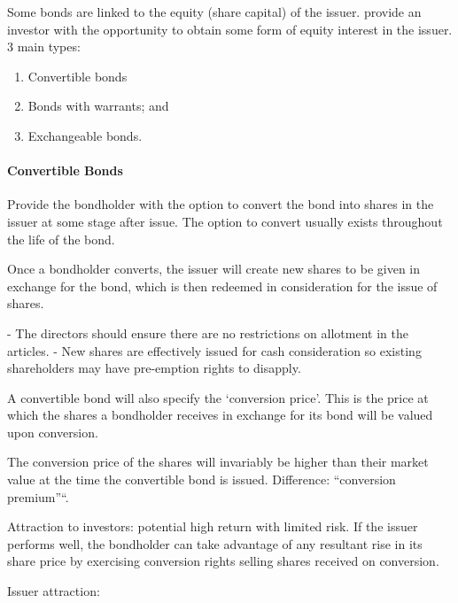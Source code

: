 \documentclass[
]{article}
\newenvironment{Shaded}{}{}
\newcommand{\NormalTok}[1]{#1}
\providecommand{\tightlist}{%
  \setlength{\itemsep}{0pt}\setlength{\parskip}{0pt}}
\begin{document}
Some bonds are linked to the equity (share capital) of the issuer.
provide an investor with the opportunity to obtain some form of equity
interest in the issuer. 3 main types:

\begin{enumerate}
\def\labelenumi{\arabic{enumi}.}
\tightlist
\item
  Convertible bonds
\item
  Bonds with warrants; and
\item
  Exchangeable bonds.
\end{enumerate}

\hypertarget{convertible-bonds}{%
\paragraph{Convertible Bonds}\label{convertible-bonds}}

Provide the bondholder with the option to convert the bond into shares
in the issuer at some stage after issue. The option to convert usually
exists throughout the life of the bond.

Once a bondholder converts, the issuer will create new shares to be
given in exchange for the bond, which is then redeemed in consideration
for the issue of shares.

\begin{Shaded}
\begin{Highlighting}[]
\NormalTok{{-} The directors should ensure there are no restrictions on allotment in the articles.}
\NormalTok{{-} New shares are effectively issued for cash consideration so existing shareholders may have pre{-}emption rights to disapply. }
\end{Highlighting}
\end{Shaded}

A convertible bond will also specify the `conversion price'. This is the
price at which the shares a bondholder receives in exchange for its bond
will be valued upon conversion.

The conversion price of the shares will invariably be higher than their
market value at the time the convertible bond is issued. Difference:
``conversion premium''``.

Attraction to investors: potential high return with limited risk. If the
issuer performs well, the bondholder can take advantage of any resultant
rise in its share price by exercising conversion rights selling shares
received on conversion.

Issuer attraction:
\end{document}
